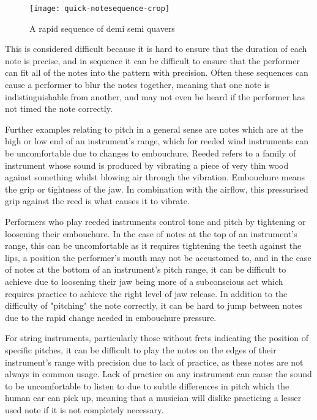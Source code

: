 \begin{figure}[H]
\centering
\texttt{[image: quick-notesequence-crop]}
\caption{A rapid sequence of demi semi quavers}
\label{fig:notesequence}	
\end{figure}

 This is considered difficult because it is hard to ensure that the duration of each note is precise, and in sequence it can be difficult to ensure that the performer can fit all of the notes into the pattern with precision. Often these sequences can cause a performer to blur the notes together, meaning that one note is indistinguishable from another, and may not even be heard if the performer has not timed the note correctly.

Further examples relating to pitch in a general sense are notes which are at the high or low end of an instrument's range, which for reeded wind instruments can be uncomfortable due to changes to embouchure. Reeded refers to a family of instrument whose sound is produced by vibrating a piece of very thin wood against something whilst blowing air through the vibration. Embouchure means the grip or tightness of the jaw. In combination with the airflow, this pressurised grip against the reed is what causes it to vibrate.

Performers who play reeded instruments control tone and pitch by tightening or loosening their embouchure. In the case of notes at the top of an instrument's range, this can be uncomfortable as it requires tightening the teeth against the lips, a position the performer's mouth may not be accustomed to, and in the case of notes at the bottom of an instrument's pitch range, it can be difficult to achieve due to loosening their jaw being more of a subconscious act which requires practice to achieve the right level of jaw release. In addition to the difficulty of "pitching" the note correctly, it can be hard to jump between notes due to the rapid change needed in embouchure pressure.

For string instruments, particularly those without frets indicating the position of specific pitches, it can be difficult to play the notes on the edges of their instrument's range with precision due to lack of practice, as these notes are not always in common usage. Lack of practice on any instrument can cause the sound to be uncomfortable to listen to due to subtle differences in pitch which the human ear can pick up, meaning that a musician will dislike practicing a lesser used note if it is not completely necessary.

